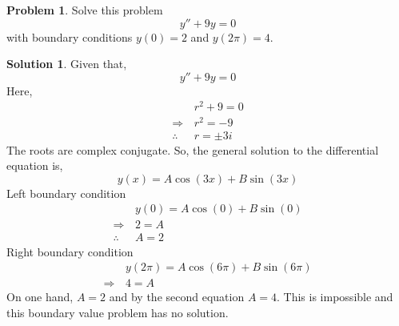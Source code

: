 \documentclass[12pt,a4paper]{article}
\theoremstyle{remark}
\theoremstyle{definition}
\newtheorem{prob}{Problem}[section]
\newtheorem*{soln}{Solution}
\begin{document}
\begin{prob}
    Solve this problem
    \[y''+9y=0\]
    with boundary conditions $ y(0)=2 $ and $ y(2\pi)=4 $.
\end{prob}
\begin{soln}
    Given that,
    \[y''+9y=0\]
    Here,
    \begin{align*}
                      & r^2+9=0  \\
        \Rightarrow\, & r^2=-9   \\
        \therefore\,  & r=\pm 3i
    \end{align*}
    The roots are complex conjugate. So, the general solution to the differential equation is,
    \[y(x)=A\cos(3x)+B\sin(3x)\]
    Left boundary condition
    \begin{align*}
                      & y(0)=A\cos(0)+B\sin(0) \\
        \Rightarrow\, & 2=A                    \\
        \therefore\,  & A=2
    \end{align*}
    Right boundary condition
    \begin{align*}
                      & y(2\pi)=A\cos(6\pi)+B\sin(6\pi) \\
        \Rightarrow\, & 4=A
    \end{align*}
    On one hand, $ A=2 $ and by the second equation $ A=4 $. This is impossible and this boundary value problem has no solution.
\end{soln}
\end{document}
